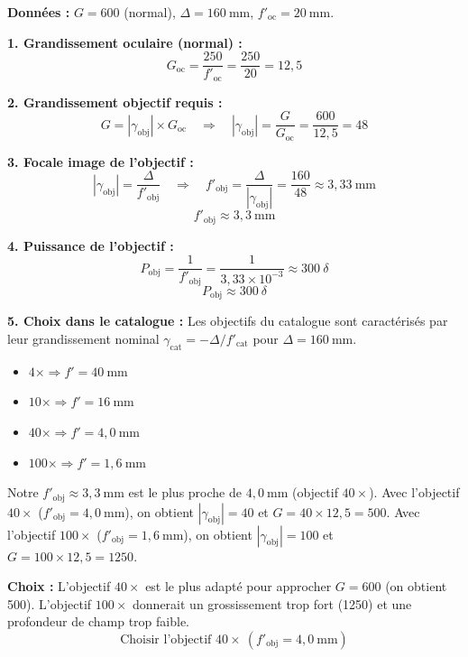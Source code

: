 \documentclass[11pt]{article}
\begin{document}
\begin{exoresolu}
\textbf{Données :} $G = 600$ (normal), $\Delta = 160\ \text{mm}$, $f'_{\text{oc}} = 20\ \text{mm}$.

\textbf{1. Grandissement oculaire (normal) :}
\[
G_{\text{oc}} = \frac{250}{f'_{\text{oc}}} = \frac{250}{20} = 12,5
\]

\textbf{2. Grandissement objectif requis :}
\[
G = |\gamma_{\text{obj}}| \times G_{\text{oc}} \quad \Rightarrow \quad |\gamma_{\text{obj}}| = \frac{G}{G_{\text{oc}}} = \frac{600}{12,5} = 48
\]

\textbf{3. Focale image de l'objectif :}
\[
|\gamma_{\text{obj}}| = \frac{\Delta}{f'_{\text{obj}}} \quad \Rightarrow \quad f'_{\text{obj}} = \frac{\Delta}{|\gamma_{\text{obj}}|} = \frac{160}{48} \approx 3,33\ \text{mm}
\]
\[
\boxed{f'_{\text{obj}} \approx 3,3\ \text{mm}}
\]

\textbf{4. Puissance de l'objectif :}
\[
P_{\text{obj}} = \frac{1}{f'_{\text{obj}}} = \frac{1}{3,33 \times 10^{-3}} \approx 300\ \delta
\]
\[
\boxed{P_{\text{obj}} \approx 300\ \delta}
\]

\textbf{5. Choix dans le catalogue :}
Les objectifs du catalogue sont caractérisés par leur grandissement nominal $\gamma_{\text{cat}} = -\Delta/f'_{\text{cat}}$ pour $\Delta = 160\ \text{mm}$.
\begin{itemize}
    \item $4\times \Rightarrow f' = 40\ \text{mm}$
    \item $10\times \Rightarrow f' = 16\ \text{mm}$
    \item $40\times \Rightarrow f' = 4,0\ \text{mm}$
    \item $100\times \Rightarrow f' = 1,6\ \text{mm}$
\end{itemize}
Notre $f'_{\text{obj}} \approx 3,3\ \text{mm}$ est le plus proche de $4,0\ \text{mm}$ (objectif $40\times$).
Avec l'objectif $40\times$ ($f'_{\text{obj}} = 4,0\ \text{mm}$), on obtient $|\gamma_{\text{obj}}| = 40$ et $G = 40 \times 12,5 = 500$.
Avec l'objectif $100\times$ ($f'_{\text{obj}} = 1,6\ \text{mm}$), on obtient $|\gamma_{\text{obj}}| = 100$ et $G = 100 \times 12,5 = 1250$.

\textbf{Choix :} L'objectif \textbf{$40\times$} est le plus adapté pour approcher $G = 600$ (on obtient 500). L'objectif $100\times$ donnerait un grossissement trop fort (1250) et une profondeur de champ trop faible.
\[
\boxed{\text{Choisir l'objectif } 40\times \ (f'_{\text{obj}} = 4,0\ \text{mm})}
\]
\end{exoresolu}
\end{document}
